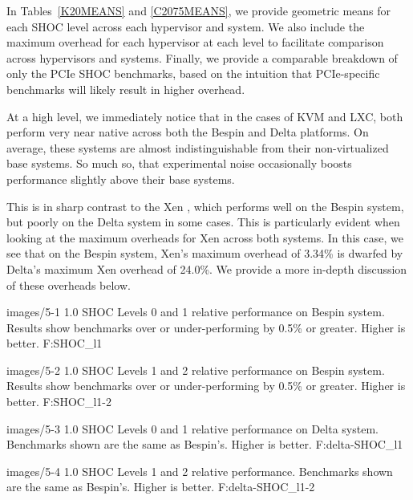 

In Tables~\ref{K20MEANS} and \ref{C2075MEANS}, we provide geometric means for each SHOC level across each
hypervisor and system.  We also include the maximum
overhead for each hypervisor at each level to facilitate comparison across
hypervisors and systems.  Finally, we provide a comparable breakdown of only the
PCIe SHOC benchmarks, based on the intuition that PCIe-specific benchmarks will
likely result in higher overhead.  

At a high level, we immediately notice that in the cases of KVM and LXC, both
perform very near native across both the Bespin and Delta platforms.  On
average, these systems are almost indistinguishable from their non-virtualized
base systems.  So much so, that experimental noise occasionally boosts
performance slightly above their base systems.  

This is in sharp contrast to the Xen , which performs well
on the Bespin system, but poorly on the Delta system in some cases.  This is
particularly evident when looking at the maximum overheads for Xen across both systems.  In this case, we see that on the Bespin system, Xen's
maximum overhead of 3.34\% is dwarfed by Delta's maximum Xen overhead of 24.0\%.
We provide a more in-depth discussion of these overheads
below.


  {images/5-1}
  {1.0}
  {SHOC Levels 0 and 1 relative performance on Bespin system.  Results show benchmarks over or
under-performing by 0.5\% or greater.  Higher is better.}
  {F:SHOC_l1} 

  {images/5-2}
  {1.0}
  {SHOC Levels 1 and 2 relative performance on Bespin system.  Results show benchmarks over or
under-performing by 0.5\% or greater.  Higher is better.}
  {F:SHOC_l1-2} 

  {images/5-3}
  {1.0}
  {SHOC Levels 0 and 1 relative performance on Delta system.  Benchmarks
shown are the same as Bespin's.  Higher is better.}
  {F:delta-SHOC_l1} 

  {images/5-4}
  {1.0}
  {SHOC Levels 1 and 2 relative performance. Benchmarks shown are the same as
Bespin's.   Higher is better.}
  {F:delta-SHOC_l1-2} 



